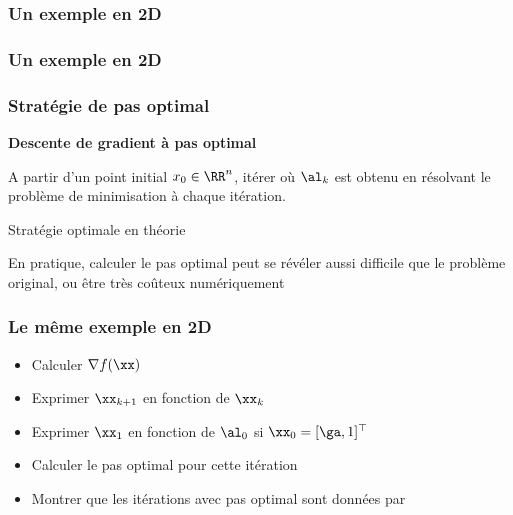 \documentclass[9pt,table]{beamer} %
\begin{document}
\begin{frame}
\frametitle{Un exemple en 2D}

\begin{figure}
	
\end{figure}
\end{frame}


\begin{frame}
\frametitle{Un exemple en 2D}

\begin{figure}
	
\end{figure}
\end{frame}






\begin{frame}
\frametitle{Stratégie de pas optimal}

\textbf{Descente de gradient à pas optimal}
\begin{tcolorbox}
	A partir d'un point initial $x_0 \in \RR^n$, itérer
	où $\al_k$ est obtenu en résolvant le problème de minimisation
	à chaque itération.
\end{tcolorbox}

\pause

Stratégie \alert{optimale en théorie}

\alert{En pratique}, calculer le pas optimal peut se révéler aussi difficile que le problème original, ou être très coûteux numériquement

\end{frame}



\begin{frame}
\frametitle{Le même exemple en 2D}


\begin{itemize}[label=-]
	\item Calculer $\nabla f(\xx)$
	\item Exprimer $\xx_{k+1}$ en fonction de $\xx_k$
	\item Exprimer $\xx_1$ en fonction de $\al_0$ si $\xx_0 = [\ga,1]^\top$
	\item Calculer le pas optimal pour cette itération
	\item Montrer que les itérations avec pas optimal sont données par
\end{itemize}


\end{frame}
\end{document}

